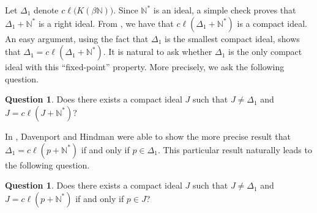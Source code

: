 \documentclass[12pt]{article}
\theoremstyle{plain}
\theoremstyle{definition}
\newtheorem{ques}[thm]{Question}
\newcommand{\bbN}{\mathbb{N}}
\begin{document}
Let $\Delta_1$ denote $c\ell\bigl(K(\beta\bbN)\bigr)$.
Since $\bbN^*$ is an ideal, a simple check proves that $\Delta_1 +
\bbN^*$ is a right ideal.
From \cite[Theorem 2.19(a)]{Hindman:1998fk}, we have that
$c\ell(\Delta_1 + \bbN^*)$ is a compact ideal.
An easy argument, using the fact that $\Delta_1$ is the smallest
compact ideal, shows that $\Delta_1 = c\ell(\Delta_1+\bbN^*)$.
It is natural to ask whether $\Delta_1$ is the only compact
ideal with this ``fixed-point'' property.
More precisely, we ask the following question.
\begin{ques}
  Does there exists a compact ideal $J$ such that $J \ne \Delta_1$ and
  $J = c\ell(J+\bbN^*)$?
\end{ques}
In \cite{Davenport:1987uq}, Davenport and Hindman were able to show
the more precise result that $\Delta_1 = c\ell(p+\bbN^*)$ if and only
if $p \in \Delta_1$.
This particular result naturally leads to the following question.
\begin{ques}
  Does there exists a compact ideal $J$ such that $J \ne \Delta_1$ and
  $J = c\ell(p + \bbN^*)$ if and only if $p \in J$?
\end{ques}
\end{document}
